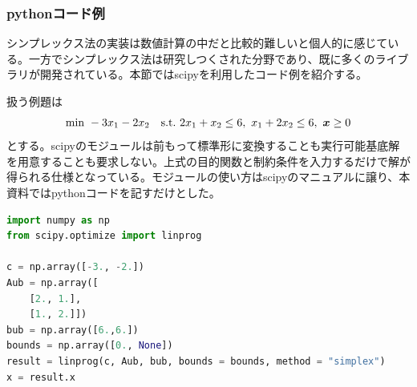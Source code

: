 \documentclass[dvipdfmx, 9pt, a4paper]{jsarticle}
\numberwithin{equation}{section}
\newcommand{\bm}[1]{{\mbox{\boldmath $#1$}}}
\begin{document}
\subsubsection{pythonコード例}
シンプレックス法の実装は数値計算の中だと比較的難しいと個人的に感じている。一方でシンプレックス法は研究しつくされた分野であり、既に多くのライブラリが開発されている。本節ではscipyを利用したコード例を紹介する。\par
扱う例題は
\begin{equation}
{\rm min}~-3x_1-2x_2~~~{\rm s.t.}~2x_1+x_2 \leq 6,~x_1+2x_2 \leq 6,~\bm x \geq 0 \notag
\end{equation}
とする。scipyのモジュールは前もって標準形に変換することも実行可能基底解を用意することも要求しない。上式の目的関数と制約条件を入力するだけで解が得られる仕様となっている。モジュールの使い方はscipyのマニュアルに譲り、本資料ではpythonコードを記すだけとした。

\begin{lstlisting}[caption=Pythonによるシンプレックス法コード例, language=Python]
import numpy as np
from scipy.optimize import linprog

c = np.array([-3., -2.])
Aub = np.array([
	[2., 1.],
	[1., 2.]])
bub = np.array([6.,6.])
bounds = np.array([0., None])
result = linprog(c, Aub, bub, bounds = bounds, method = "simplex")
x = result.x
\end{lstlisting}
\end{document}
